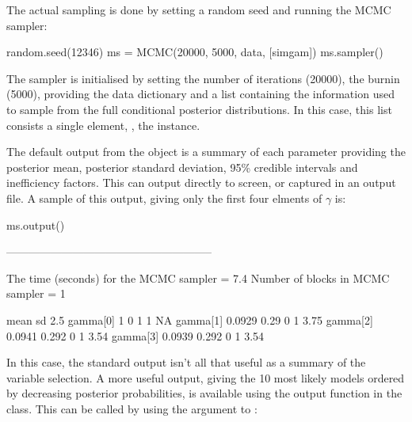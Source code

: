\documentclass[article]{jss}
\begin{document}
The actual sampling is done by setting a random seed and running the
MCMC sampler:
\begin{Code}
random.seed(12346)
ms = MCMC(20000, 5000, data, [simgam])
ms.sampler()
\end{Code}

The  sampler is initialised by setting the number of
iterations (20000), the burnin (5000), providing the data dictionary
 and a list containing the information used to sample from
the full conditional posterior distributions. In this case, this list
consists a single element, , the 
instance.

The default output from the  object is a summary of each
parameter providing the posterior mean, posterior standard deviation,
95\% credible intervals and inefficiency factors. This can output
directly to screen, or captured in an output file. A sample of this
output, giving only the first four elments of $\gamma$ is:

\begin{CodeChunk}
\begin{CodeInput}
ms.output()
\end{CodeInput}
\begin{CodeOutput}
--------------------------------------------------------

The time (seconds) for the MCMC sampler =  7.4
Number of blocks in MCMC sampler =  1

                    mean          sd         2.5%
    gamma[0]           1           0            1           1         NA
    gamma[1]      0.0929        0.29            0           1         3.75
    gamma[2]      0.0941       0.292            0           1         3.54
    gamma[3]      0.0939       0.292            0           1         3.54
\end{CodeOutput}
\end{CodeChunk}

In this case, the standard output isn't all that useful as a summary
of the variable selection. A more useful output, giving the 10 most
likely models ordered by decreasing posterior probabilities, is
available using the output function in the 
class. This can be called by using the  argument to
:
\end{document}
